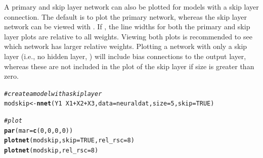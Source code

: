 \documentclass[article,shortnames]{jss}\usepackage[]{graphicx}\usepackage[]{color}
\makeatletter
\newcommand{\hlnum}[1]{\textcolor[rgb]{0.686,0.059,0.569}{#1}}%
\newcommand{\hlcom}[1]{\textcolor[rgb]{0.678,0.584,0.686}{\textit{#1}}}%
\newcommand{\hlopt}[1]{\textcolor[rgb]{0,0,0}{#1}}%
\newcommand{\hlstd}[1]{\textcolor[rgb]{0.345,0.345,0.345}{#1}}%
\newcommand{\hlkwb}[1]{\textcolor[rgb]{0.69,0.353,0.396}{#1}}%
\newcommand{\hlkwc}[1]{\textcolor[rgb]{0.333,0.667,0.333}{#1}}%
\newcommand{\hlkwd}[1]{\textcolor[rgb]{0.737,0.353,0.396}{\textbf{#1}}}%
\newenvironment{kframe}{%
 \def\at@end@of@kframe{}%
 \ifinner\ifhmode%
  \def\at@end@of@kframe{\end{minipage}}%
  \begin{minipage}{\columnwidth}%
 \fi\fi%
 \def\FrameCommand##1{\hskip\@totalleftmargin \hskip-\fboxsep
 \colorbox{shadecolor}{##1}\hskip-\fboxsep
     \hskip-\linewidth \hskip-\@totalleftmargin \hskip\columnwidth}%
 \MakeFramed {\advance\hsize-\width
   \@totalleftmargin\z@ \linewidth\hsize
   \@setminipage}}%
 {\par\unskip\endMakeFramed%
 \at@end@of@kframe}
\newenvironment{knitrout}{}{} %
\makeatother
\begin{document}
A primary and skip layer network can also be plotted for  models with a skip layer connection. The default is to plot the primary network, whereas the skip layer network can be viewed with . If , the line widths for both the primary and skip layer plots are relative to all weights. Viewing both plots is recommended to see which network has larger relative weights. Plotting a network with only a skip layer (i.e., no hidden layer, ) will include bias connections to the output layer, whereas these are not included in the plot of the skip layer if size is greater than zero.

\begin{knitrout}
\color{fgcolor}\begin{kframe}
\begin{alltt}
\hlcom{# create a model with a skip layer}
\hlstd{modskip} \hlkwb{<-} \hlkwd{nnet}\hlstd{(Y1} \hlopt{~} \hlstd{X1} \hlopt{+} \hlstd{X2} \hlopt{+} \hlstd{X3,} \hlkwc{data} \hlstd{= neuraldat,} \hlkwc{size} \hlstd{=} \hlnum{5}\hlstd{,} \hlkwc{skip} \hlstd{=} \hlnum{TRUE}\hlstd{)}

\hlcom{# plot}
\hlkwd{par}\hlstd{(}\hlkwc{mar} \hlstd{=} \hlkwd{c}\hlstd{(}\hlnum{0}\hlstd{,} \hlnum{0}\hlstd{,} \hlnum{0}\hlstd{,} \hlnum{0}\hlstd{))}
\hlkwd{plotnet}\hlstd{(modskip,} \hlkwc{skip} \hlstd{=} \hlnum{TRUE}\hlstd{,} \hlkwc{rel_rsc} \hlstd{=} \hlnum{8}\hlstd{)}
\hlkwd{plotnet}\hlstd{(modskip,} \hlkwc{rel_rsc} \hlstd{=} \hlnum{8}\hlstd{)}
\end{alltt}
\end{kframe}\begin{figure}[!ht]


\end{figure}
\end{knitrout}
\end{document}
